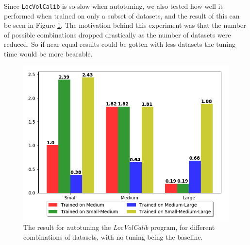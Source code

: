 Since \texttt{LocVolCalib} is so slow when autotuning, we also tested how well
it performed when trained on only a subset of datasets, and the result of this
can be seen in Figure \ref{LocVolCalibAll}. The motivation behind this
experiment was that the number of possible combinations dropped drastically as
the number of datasets were reduced. So if near equal results could be gotten
with less datasets the tuning time would be more bearable.

\begin{figure}[H]
	\centering
	\includegraphics[width=.7\textwidth]{../benchmarks/LocVolCalibAll.png}
  \caption{The result for autotuning the \textit{LocVolCalib} program, for different combinations of datasets, with no tuning being the baseline.}
	\label{LocVolCalibAll}
\end{figure}
